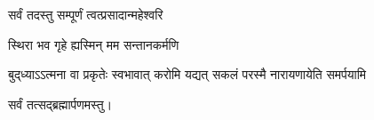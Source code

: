 
{सर्वं तदस्तु सम्पूर्णं त्वत्प्रसादान्महेश्वरि}

{स्थिरा भव गृहे ह्यस्मिन् मम सन्तानकर्मणि}


{बुद्‌ध्याऽऽत्मना वा प्रकृतेः स्वभावात्}
{करोमि यद्यत् सकलं परस्मै}
{नारायणायेति समर्पयामि}

\centerline{सर्वं तत्सद्ब्रह्मार्पणमस्तु।}

\closesub


\closesection
